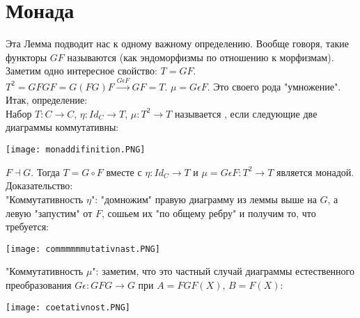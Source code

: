 \documentclass[a4paper]{article}
\theoremstyle{indented}
\theoremstyle{definition}
\theoremstyle{remark}
\DeclareMathOperator{\ra}{\rightarrow}
\begin{document}
\section{Монада}
Эта Лемма подводит нас к одному важному определению.
Вообще говоря, такие функторы $GF$ называются  (как эндоморфизмы по отношению к морфизмам). Заметим одно интересное свойство: $T = GF$. $T^2 = GFGF = G(FG)F \overset{G\epsilon F}{\ra} GF = T$. $\mu = G\epsilon F$.
\remark Это своего рода "умножение".\\
Итак, определение: \\
Набор $T: C \ra C$, $\eta: Id_C \ra T$, $\mu: T^2 \ra T$ называется , если следующие две диаграммы коммутативны:
\begin{center}\texttt{[image: monaddifinition.PNG]}\end{center}
\theorem $F \dashv G$. Тогда $T = G \circ F$ вместе с $\eta: Id_C \ra T$ и $\mu = G \epsilon F: T^2 \ra T$ является монадой. \\
Доказательство:\\
"Коммутативность $\eta$": "домножим" правую диаграмму из леммы выше на $G$, а левую "запустим" от $F$, сошьем их "по общему ребру" и получим то, что требуется:
\begin{center}\texttt{[image: commmmmmutativnast.PNG]}\end{center}
"Коммутативность $\mu$": заметим, что это частный случай диаграммы естественного преобразования $G\epsilon: GFG \ra G$ при $A = FGF(X)$, $B = F(X)$:
\begin{center}\texttt{[image: coetativnost.PNG]}\end{center}
\end{document}
